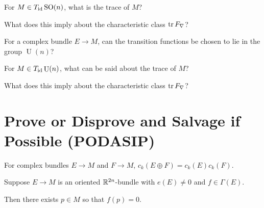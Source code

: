 \documentclass{homework}
\DeclareMathOperator{\U}{U}
\begin{document}
\begin{problem}
  For $M \in T_{\operatorname{id}} \operatorname{SO}(n)$, what is the trace of $M$?

  What does this imply about the characteristic class $\operatorname{tr} F_\nabla$?
\end{problem}

\begin{problem}
 For a complex bundle $E \to M$, can the transition functions be chosen to lie in the group $\U(n)$?  
\end{problem}

\begin{problem}
  For $M \in T_{\id} \U(n)$, what can be said about the trace of $M$?

  What does this imply about the characteristic class $\operatorname{tr} F_\nabla$?
\end{problem}

\section{Prove or Disprove and Salvage if Possible (PODASIP)}

\begin{problem}
  For complex bundles $E \to M$ and $F \to M$, 
    $c_k(E \oplus F) = c_k(E) c_k(F)$.
\end{problem}

\begin{problem}
  Suppose $E \to M$ is an oriented $\mathbb{R}^{2n}$-bundle with $e(E) \neq 0$ and $f \in \Gamma(E)$.

  Then there exists $p \in M$ so that $f(p) = 0$.
\end{problem}
\end{document}
